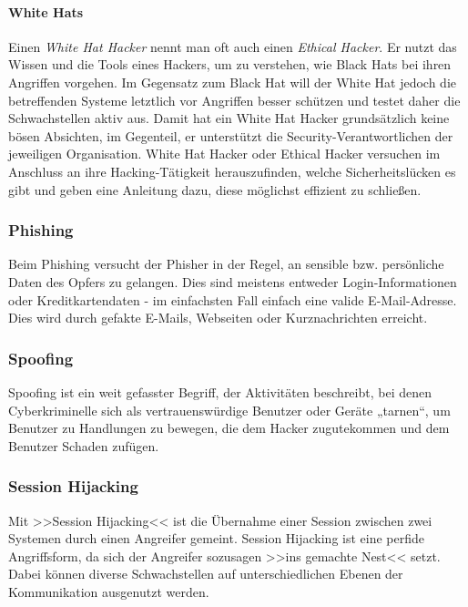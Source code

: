 \paragraph{White Hats} Einen \textit{White Hat Hacker} nennt man oft auch einen \textit{Ethical Hacker}. Er nutzt das Wissen und die Tools eines Hackers, um zu verstehen, wie Black Hats bei ihren Angriffen vorgehen. Im Gegensatz zum Black Hat will der White Hat jedoch die betreffenden Systeme letztlich vor Angriffen besser schützen und testet daher die Schwachstellen aktiv aus. Damit hat ein White Hat Hacker grundsätzlich keine bösen Absichten, im Gegenteil, er unterstützt die Security-Verantwortlichen der jeweiligen Organisation. White Hat Hacker oder Ethical Hacker versuchen im Anschluss an ihre Hacking-Tätigkeit herauszufinden, welche Sicherheitslücken es gibt und geben eine Anleitung dazu, diese möglichst effizient zu schließen.

\subsubsection{Phishing}
\label{sec:Phishing}

Beim Phishing versucht der Phisher in der Regel, an sensible bzw. persönliche Daten des Opfers zu gelangen. Dies sind meistens entweder Login-Informationen oder Kreditkartendaten - im einfachsten Fall einfach eine valide E-Mail-Adresse. Dies wird durch gefakte E-Mails, Webseiten oder Kurznachrichten erreicht.

\subsubsection{Spoofing}
\label{sec:Spoofing}


Spoofing ist ein weit gefasster Begriff, der Aktivitäten beschreibt, bei denen Cyberkriminelle sich als vertrauenswürdige Benutzer oder Geräte „tarnen“, um Benutzer zu Handlungen zu bewegen, die dem Hacker zugutekommen und dem Benutzer Schaden zufügen.

\subsubsection{Session Hijacking}
\label{sec:SessionHijacking}

Mit >>Session Hijacking<< ist die Übernahme einer Session zwischen zwei Systemen durch einen Angreifer gemeint. Session Hijacking ist eine perfide Angriffsform, da sich der Angreifer sozusagen >>ins gemachte Nest<< setzt. Dabei können diverse Schwachstellen auf unterschiedlichen Ebenen der Kommunikation ausgenutzt werden.


